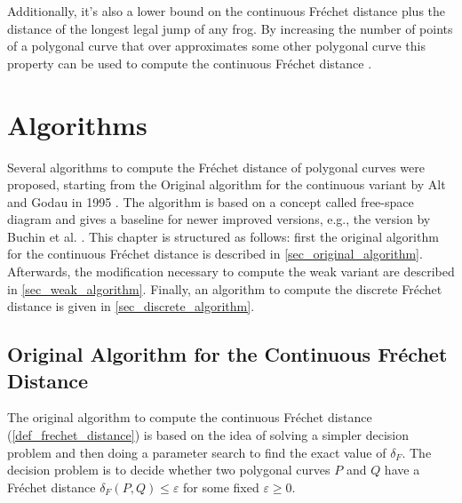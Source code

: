 \documentclass[
oneside,
fontsize=11pt
]{scrartcl}
\begin{document}
Additionally, it's also a lower bound on the continuous Fréchet distance 
plus the distance of the longest legal jump of any frog. 
By increasing the number of points of a polygonal curve that 
over approximates some other polygonal curve
this property can be used to compute the continuous Fréchet distance \cite{eiter_computing_1994}.






\section{Algorithms}
\label{sec_algorithms}
Several algorithms to compute the Fréchet distance of polygonal curves were proposed, 
starting from the Original algorithm for the continuous variant by Alt and Godau in 1995 \cite{alt_computing_1995}.
The algorithm is based on a concept called free-space diagram and gives a baseline for newer improved versions, 
e.g., the version by Buchin et al. \cite{buchin_four_2017}. 
This chapter is structured as follows: 
first the original algorithm for the continuous Fréchet distance is described in \autoref{sec_original_algorithm}.
Afterwards, the modification necessary to compute the weak variant are described in \autoref{sec_weak_algorithm}.
Finally, an algorithm to compute the discrete Fréchet distance is given in \autoref{sec_discrete_algorithm}.


\subsection{Original Algorithm for the Continuous Fréchet Distance}
\label{sec_original_algorithm}
The original algorithm to compute the continuous Fréchet distance (\autoref{def_frechet_distance})
is based on the idea of solving a simpler decision problem and then doing a parameter search to find the exact value of $\delta_{F}$.
The decision problem is to decide whether two polygonal curves $P$ and $Q$ have a 
Fréchet distance $\delta_{F}(P,Q) \leq \varepsilon$ for some fixed $\varepsilon \geq 0$.
\end{document}
